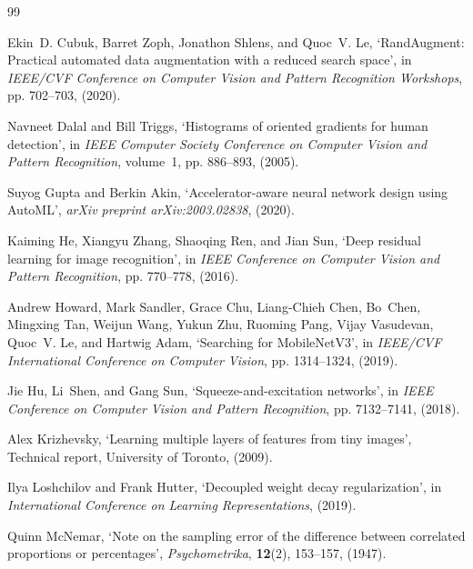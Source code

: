 \documentclass[10pt,twocolumn]{article}
\begin{document}

{\small
\begin{thebibliography}{99}
\setlength{\itemsep}{1pt}

Ekin~D. Cubuk, Barret Zoph, Jonathon Shlens, and Quoc~V. Le, `RandAugment: Practical automated data
augmentation with a reduced search space', in \emph{IEEE/CVF Conference on Computer Vision and Pattern
Recognition Workshops}, pp. 702--703, (2020).

Navneet Dalal and Bill Triggs, `Histograms of oriented gradients for human detection', in \emph{IEEE
Computer Society Conference on Computer Vision and Pattern Recognition}, volume~1, pp. 886--893, (2005).

Suyog Gupta and Berkin Akin, `Accelerator-aware neural network design using AutoML', \emph{arXiv
preprint arXiv:2003.02838}, (2020).

Kaiming He, Xiangyu Zhang, Shaoqing Ren, and Jian Sun, `Deep residual learning for image recognition',
in \emph{IEEE Conference on Computer Vision and Pattern Recognition}, pp. 770--778, (2016).

Andrew Howard, Mark Sandler, Grace Chu, Liang-Chieh Chen, Bo~Chen, Mingxing Tan, Weijun Wang, Yukun Zhu,
Ruoming Pang, Vijay Vasudevan, Quoc~V. Le, and Hartwig Adam, `Searching for MobileNetV3', in
\emph{IEEE/CVF International Conference on Computer Vision}, pp. 1314--1324, (2019).

Jie Hu, Li~Shen, and Gang Sun, `Squeeze-and-excitation networks', in \emph{IEEE Conference on Computer
Vision and Pattern Recognition}, pp. 7132--7141, (2018).

Alex Krizhevsky, `Learning multiple layers of features from tiny images', Technical report,
University of Toronto, (2009).

Ilya Loshchilov and Frank Hutter, `Decoupled weight decay regularization', in \emph{International
Conference on Learning Representations}, (2019).

Quinn McNemar, `Note on the sampling error of the difference between correlated proportions or
percentages', \emph{Psychometrika}, \textbf{12}(2), 153--157, (1947).


\end{thebibliography}}
\end{document}
